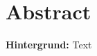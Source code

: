 %
%
\thispagestyle{empty} 
\let\raggedsection\centering 
\chapter*{Abstract}\label{abstract}
\let\raggedsection\raggedright 
\textbf{Hintergrund:} Text

